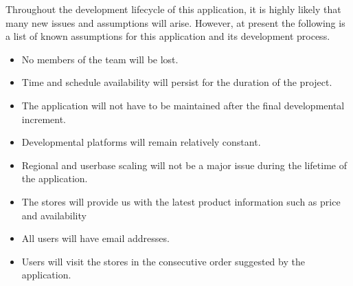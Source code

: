 %
%
%
%
Throughout the development lifecycle of this application, it is highly likely that many new issues and assumptions will arise.  
However, at present the following is a list of known assumptions for this application and its development process.

\begin{itemize}
  \item No members of the team will be lost.
  \item Time and schedule availability will persist for the duration of the project.
  \item The application will not have to be maintained after the final developmental increment.
  \item Developmental platforms will remain relatively constant.
  \item Regional and userbase scaling will not be a major issue during the lifetime of the application.
  \item  The stores will provide us with the latest product information such as price and availability
  \item All users will have email addresses.
  \item Users will visit the stores in the consecutive order suggested by the application.
\end{itemize}